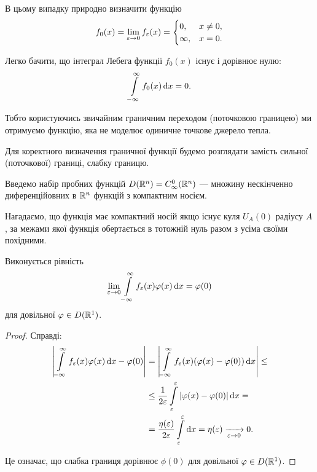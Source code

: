 В цьому випадку природно визначити функцію 
\begin{equation}
	f_0(x) = \displaystyle\lim\limits_{\varepsilon \to 0} f_\varepsilon(x) = \begin{cases}
		0, & x \ne 0, \\
		\infty, & x = 0.
	\end{cases}
\end{equation}

Легко бачити, що інтеграл Лебега функції $f_0(x)$ існує і дорівнює нулю:
\begin{equation}
	\displaystyle\int\limits_{-\infty}^\infty f_0(x) \mathop{}\!\mathrm{d} x = 0.
\end{equation}

Тобто користуючись звичайним граничним переходом (поточковою границею) ми отримуємо функцію, яка не моделює одиничне точкове джерело тепла. \medskip

Для коректного визначення граничної функції будемо розглядати замість сильної (поточкової) границі, слабку границю. \medskip

Введемо набір пробних функцій $D(\mathbb{R}^n) = C_\infty^0 (\mathbb{R}^n)$ --- множину нескінченно диференційовних в $\mathbb{R}^n$ функцій з компактним носієм. 

\begin{remark}
	Нагадаємо, що функція має компактний носій якщо існує куля $U_A(0)$ радіусу $A$, за межами якої функція обертається в тотожній нуль разом з усіма своїми похідними.
\end{remark}

\begin{proposition}
	Виконується рівність
	\begin{equation}
		\displaystyle\lim\limits_{\varepsilon \to 0} \displaystyle\int\limits_{-\infty}^\infty f_\varepsilon(x) \varphi(x) \mathop{}\!\mathrm{d} x = \varphi(0)
	\end{equation}	
	для довільної $\varphi \in D(\mathbb{R}^1)$.
\end{proposition}

\begin{proof}
	Справді:
	\begin{equation}
		\begin{aligned}
			\left| \displaystyle\int\limits_{-\infty}^\infty f_\varepsilon(x) \varphi(x) \mathop{}\!\mathrm{d} x - \varphi(0) \right| &= \left| \displaystyle\int\limits_{-\infty}^\infty f_\varepsilon(x) (\varphi(x) - \varphi(0)) \mathop{}\!\mathrm{d} x \right| \le \\
			&\le \frac{1}{2\varepsilon} \displaystyle\int\limits_\varepsilon^\varepsilon |\varphi(x) - \varphi(0)| \mathop{}\!\mathrm{d} x = \\
			&= \frac{\eta(\varepsilon)}{2\varepsilon} \displaystyle\int\limits_\varepsilon^\varepsilon \mathop{}\!\mathrm{d} x = \eta(\varepsilon) \xrightarrow[\varepsilon \to 0]{} 0.
		\end{aligned}	
	\end{equation}

	Це означає, що слабка границя дорівнює $\phi(0)$ для довільної $\varphi \in D(\mathbb{R}^1)$.
\end{proof}
	
